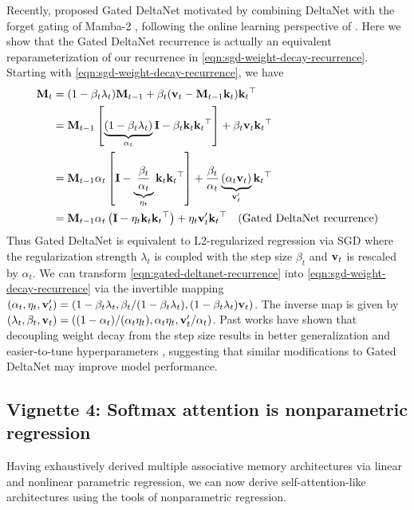 \documentclass[notitlepage, 11pt]{article}
\begin{document}
Recently, \citet{Yang2024GatedDeltaNetworks} proposed Gated DeltaNet motivated by combining DeltaNet \citep{Schlag2021LinearTransformersAre} with the forget gating of Mamba-2 \citep{Dao2024TransformersAreSSMs}, following the online learning perspective of \citet{Liu2024LonghornStateSpace}.
Here we show that the Gated DeltaNet recurrence is actually an equivalent reparameterization of our recurrence in \autoref{eqn:sgd-weight-decay-recurrence}. Starting with \autoref{eqn:sgd-weight-decay-recurrence}, we have
\begin{align}
    \mathbf{M}_t &= (1 - \beta_t\lambda_t) \mathbf{M}_{t-1} + \beta_t(\mathbf{v}_t - \mathbf{M}_{t-1}\mathbf{k}_t)\mathbf{k}_t{}^\top \\
    &= \mathbf{M}_{t-1}\left[ \underbrace{( 1 - \beta_t \lambda_t)}_{\alpha_t}\mathbf{I} - \beta_t\mathbf{k}_t\mathbf{k}_t{}^\top \right] + \beta_t \mathbf{v}_t\mathbf{k}_t{}^\top \\
    &= \mathbf{M}_{t-1}\alpha_t\left[\mathbf{I} - \underbrace{\frac{\beta_t}{\alpha_t}}_{\eta_t}\mathbf{k}_t\mathbf{k}_t{}^\top \right] + \frac{\beta_t}{\alpha_t} \underbrace{(\alpha_t \mathbf{v}_t)}_{\mathbf{v}'_t}\mathbf{k}_t{}^\top \\
    &= \mathbf{M}_{t-1}\alpha_t\left(\mathbf{I} - \eta_t\mathbf{k}_t\mathbf{k}_t{}^\top \right) + \eta_t \mathbf{v}'_t\mathbf{k}_t{}^\top \quad \text{(Gated DeltaNet recurrence)}\label{eqn:gated-deltanet-recurrence}
\end{align}
Thus Gated DeltaNet is equivalent to L2-regularized regression via SGD where the regularization strength $\lambda_t$ is coupled with the step size $\beta_t$ and $\mathbf{v}_t$ is rescaled by $\alpha_t$.
We can transform \autoref{eqn:gated-deltanet-recurrence} into \autoref{eqn:sgd-weight-decay-recurrence} via the invertible mapping $(\alpha_t, \eta_t, \mathbf{v}_t') = (1 - \beta_t\lambda_t, \beta_t/(1 - \beta_t\lambda_t), (1 - \beta_t\lambda_t)\mathbf{v}_t)$.
The inverse map is given by $(\lambda_t, \beta_t, \mathbf{v}_t) = ((1-\alpha_t)/(\alpha_t\eta_t), \alpha_t\eta_t,\allowbreak \mathbf{v}'_t/\alpha_t)$.
Past works have shown that decoupling weight decay from the step size results in better generalization and easier-to-tune hyperparameters \citep{Loshchilov2019DecoupledWeightDecay}, suggesting that similar modifications to Gated DeltaNet may improve model performance.

\subsection*{Vignette 4: Softmax attention is nonparametric regression}\label{vig:softmax-attention-is-nonparametric}
Having exhaustively derived multiple associative memory architectures via linear and nonlinear parametric regression, we can now derive self-attention-like architectures using the tools of nonparametric regression.
\end{document}
